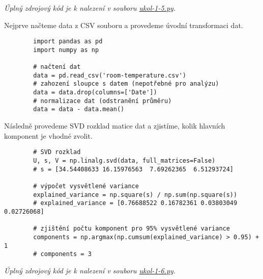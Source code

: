 \documentclass[10pt, a4paper]{ReportSheet}
\begin{document}
    \textit{
        Úplný zdrojový kód je k nalezení v souboru \href{https://github.com/filipditrich/MMAD-2024/blob/main/ukol-1-5.py}{ukol-1-5.py}.
    }
    \newpage

    Nejprve načteme data z CSV souboru a provedeme úvodní transformaci dat.
    \begin{verbatim}
        import pandas as pd
        import numpy as np

        # načtení dat
        data = pd.read_csv('room-temperature.csv')
        # zahození sloupce s datem (nepotřebné pro analýzu)
        data = data.drop(columns=['Date'])
        # normalizace dat (odstranění průměru)
        data = data - data.mean()
    \end{verbatim}

    Následně provedeme SVD rozklad matice dat a zjistíme, kolik hlavních komponent je vhodné zvolit.
    \begin{verbatim}
        # SVD rozklad
        U, s, V = np.linalg.svd(data, full_matrices=False)
        # s = [34.54408633 16.15976563  7.69262365  6.51293724]

        # výpočet vysvětlené variance
        explained_variance = np.square(s) / np.sum(np.square(s))
        # explained_variance = [0.76688522 0.16782361 0.03803049 0.02726068]

        # zjištění počtu komponent pro 95% vysvětlené variance
        components = np.argmax(np.cumsum(explained_variance) > 0.95) + 1
        # components = 3
    \end{verbatim}


    \textit{
        Úplný zdrojový kód je k nalezení v souboru \href{https://github.com/filipditrich/MMAD-2024/blob/main/ukol-1-6.py}{ukol-1-6.py}.
    }
    \newpage
\end{document}
